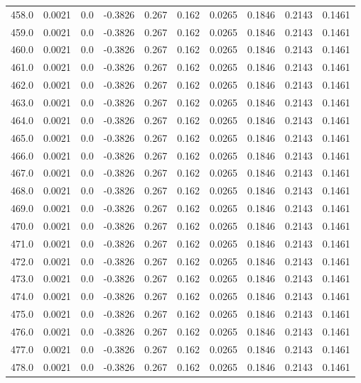 \begin{longtable}{lrrrrrrrrr}
458.0 & 0.0021 & 0.0 & -0.3826 & 0.267 & 0.162 & 0.0265 & 0.1846 & 0.2143 & 0.1461 \\
459.0 & 0.0021 & 0.0 & -0.3826 & 0.267 & 0.162 & 0.0265 & 0.1846 & 0.2143 & 0.1461 \\
460.0 & 0.0021 & 0.0 & -0.3826 & 0.267 & 0.162 & 0.0265 & 0.1846 & 0.2143 & 0.1461 \\
461.0 & 0.0021 & 0.0 & -0.3826 & 0.267 & 0.162 & 0.0265 & 0.1846 & 0.2143 & 0.1461 \\
462.0 & 0.0021 & 0.0 & -0.3826 & 0.267 & 0.162 & 0.0265 & 0.1846 & 0.2143 & 0.1461 \\
463.0 & 0.0021 & 0.0 & -0.3826 & 0.267 & 0.162 & 0.0265 & 0.1846 & 0.2143 & 0.1461 \\
464.0 & 0.0021 & 0.0 & -0.3826 & 0.267 & 0.162 & 0.0265 & 0.1846 & 0.2143 & 0.1461 \\
465.0 & 0.0021 & 0.0 & -0.3826 & 0.267 & 0.162 & 0.0265 & 0.1846 & 0.2143 & 0.1461 \\
466.0 & 0.0021 & 0.0 & -0.3826 & 0.267 & 0.162 & 0.0265 & 0.1846 & 0.2143 & 0.1461 \\
467.0 & 0.0021 & 0.0 & -0.3826 & 0.267 & 0.162 & 0.0265 & 0.1846 & 0.2143 & 0.1461 \\
468.0 & 0.0021 & 0.0 & -0.3826 & 0.267 & 0.162 & 0.0265 & 0.1846 & 0.2143 & 0.1461 \\
469.0 & 0.0021 & 0.0 & -0.3826 & 0.267 & 0.162 & 0.0265 & 0.1846 & 0.2143 & 0.1461 \\
470.0 & 0.0021 & 0.0 & -0.3826 & 0.267 & 0.162 & 0.0265 & 0.1846 & 0.2143 & 0.1461 \\
471.0 & 0.0021 & 0.0 & -0.3826 & 0.267 & 0.162 & 0.0265 & 0.1846 & 0.2143 & 0.1461 \\
472.0 & 0.0021 & 0.0 & -0.3826 & 0.267 & 0.162 & 0.0265 & 0.1846 & 0.2143 & 0.1461 \\
473.0 & 0.0021 & 0.0 & -0.3826 & 0.267 & 0.162 & 0.0265 & 0.1846 & 0.2143 & 0.1461 \\
474.0 & 0.0021 & 0.0 & -0.3826 & 0.267 & 0.162 & 0.0265 & 0.1846 & 0.2143 & 0.1461 \\
475.0 & 0.0021 & 0.0 & -0.3826 & 0.267 & 0.162 & 0.0265 & 0.1846 & 0.2143 & 0.1461 \\
476.0 & 0.0021 & 0.0 & -0.3826 & 0.267 & 0.162 & 0.0265 & 0.1846 & 0.2143 & 0.1461 \\
477.0 & 0.0021 & 0.0 & -0.3826 & 0.267 & 0.162 & 0.0265 & 0.1846 & 0.2143 & 0.1461 \\
478.0 & 0.0021 & 0.0 & -0.3826 & 0.267 & 0.162 & 0.0265 & 0.1846 & 0.2143 & 0.1461 \\

\end{longtable}
